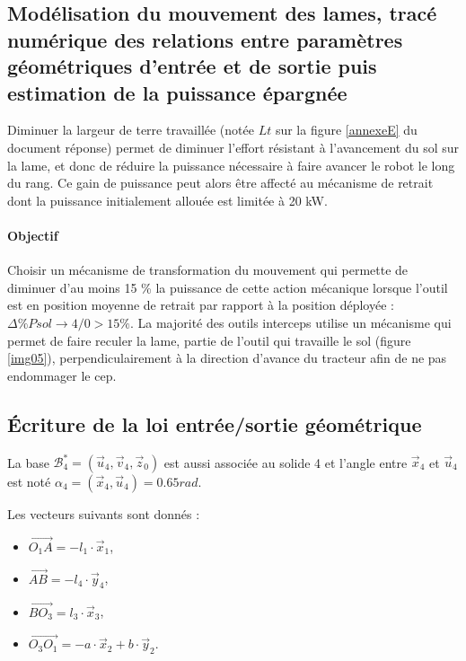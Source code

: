 \subsection{Modélisation du mouvement des lames, tracé numérique des relations entre paramètres géométriques d'entrée et de sortie puis estimation de la puissance épargnée}

Diminuer la largeur de terre travaillée (notée $Lt$ sur la figure \ref{annexeE} du document réponse) permet de diminuer l'effort résistant à l'avancement du sol sur la lame, et donc de réduire la puissance nécessaire à faire avancer le robot le long du rang. Ce gain de puissance peut alors être affecté au mécanisme de retrait dont la puissance initialement allouée est limitée à 20 kW.

\paragraph{Objectif}

Choisir un mécanisme de transformation du mouvement qui permette de diminuer d'au moins 15 \% la puissance de cette action mécanique lorsque l'outil est en position moyenne de retrait par rapport
à la position déployée : $\Delta\% P sol\rightarrow 4/0 > 15 \%$.
La majorité des outils interceps utilise un mécanisme qui permet de faire reculer la lame, partie de l'outil qui
travaille le sol (figure \ref{img05}), perpendiculairement à la direction d'avance du tracteur afin de ne pas endommager le
cep.

\subsection{Écriture de la loi entrée/sortie géométrique}

La base $\mathcal{B}^*_4=(\vec{u}_4,\vec{v}_4,\vec{z}_0)$ est aussi associée au solide 4 et l'angle entre $\vec{x}_4$ et $\vec{u}_4$ est noté $\alpha_4=(\vec{x}_4,\vec{u}_4)=0.65rad$.

Les vecteurs suivants sont donnés :
\begin{itemize}
 \item $\overrightarrow{O_1A}=-l_1\cdot\vec{x}_1$,
 \item $\overrightarrow{AB}=-l_4\cdot\vec{y}_4$,
 \item $\overrightarrow{BO_3}=l_3\cdot\vec{x}_3$,
 \item $\overrightarrow{O_3O_1}=-a\cdot\vec{x}_2+b\cdot\vec{y}_2$.
\end{itemize}

